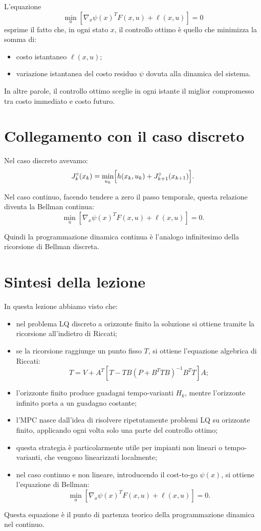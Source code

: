 L'equazione
\[
\min_u
\left[
\nabla_x\psi(x)^T F(x,u)+\ell(x,u)
\right]
=0
\]
esprime il fatto che, in ogni stato \(x\), il controllo ottimo è quello che minimizza
la somma di:
\begin{itemize}
    \item costo istantaneo \(\ell(x,u)\);
    \item variazione istantanea del costo residuo \(\psi\) dovuta alla dinamica del sistema.
\end{itemize}

In altre parole, il controllo ottimo sceglie in ogni istante il miglior compromesso
tra costo immediato e costo futuro.

\section{Collegamento con il caso discreto}

Nel caso discreto avevamo:
\[
J_k^\circ(x_k)=\min_{u_k}\Bigl[h(x_k,u_k)+J_{k+1}^\circ(x_{k+1})\Bigr].
\]

Nel caso continuo, facendo tendere a zero il passo temporale,
questa relazione diventa la Bellman continua:
\[
\min_u
\left[
\nabla_x\psi(x)^T F(x,u)+\ell(x,u)
\right]=0.
\]

Quindi la programmazione dinamica continua è l'analogo infinitesimo
della ricorsione di Bellman discreta.

\section{Sintesi della lezione}

In questa lezione abbiamo visto che:

\begin{itemize}
    \item nel problema LQ discreto a orizzonte finito la soluzione si ottiene
    tramite la ricorsione all'indietro di Riccati;
    \item se la ricorsione raggiunge un punto fisso \(T\), si ottiene
    l'equazione algebrica di Riccati:
    \[
    T
    =
    V
    +
    A^T
    \left[
    T
    -
    TB(P+B^TTB)^{-1}B^TT
    \right]A;
    \]
    \item l'orizzonte finito produce guadagni tempo-varianti \(H_k\),
    mentre l'orizzonte infinito porta a un guadagno costante;
    \item l'MPC nasce dall'idea di risolvere ripetutamente problemi LQ su orizzonte finito,
    applicando ogni volta solo una parte del controllo ottimo;
    \item questa strategia è particolarmente utile per impianti non lineari o
    tempo-varianti, che vengono linearizzati localmente;
    \item nel caso continuo e non lineare, introducendo il cost-to-go
    \(\psi(x)\), si ottiene l'equazione di Bellman:
    \[
    \min_u\left[\nabla_x\psi(x)^T F(x,u)+\ell(x,u)\right]=0.
    \]
\end{itemize}

Questa equazione è il punto di partenza teorico della programmazione dinamica
nel continuo.